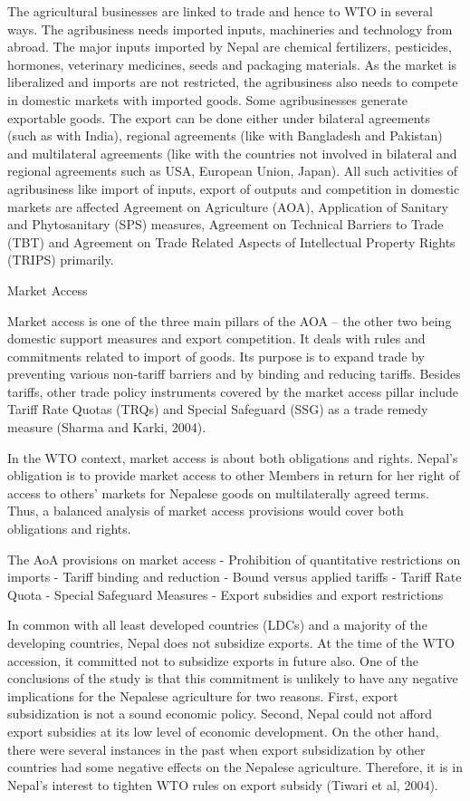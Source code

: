 \documentclass[
]{book}
\begin{document}
The agricultural businesses are linked to trade and hence to WTO in several ways. The agribusiness needs imported inputs, machineries and technology from abroad. The major inputs imported by Nepal are chemical fertilizers, pesticides, hormones, veterinary medicines, seeds and packaging materials. As the market is liberalized and imports are not restricted, the agribusiness also needs to compete in domestic markets with imported goods. Some agribusinesses generate exportable goods. The export can be done either under bilateral agreements (such as with India), regional agreements (like with Bangladesh and Pakistan) and multilateral agreements (like with the countries not involved in bilateral and regional agreements such as USA, European Union, Japan). All such activities of agribusiness like import of inputs, export of outputs and competition in domestic markets are affected Agreement on Agriculture (AOA), Application of Sanitary and Phytosanitary (SPS) measures, Agreement on Technical Barriers to Trade (TBT) and Agreement on Trade Related Aspects of Intellectual Property Rights (TRIPS) primarily.

Market Access

Market access is one of the three main pillars of the AOA -- the other two being domestic support measures and export competition. It deals with rules and commitments related to import of goods. Its purpose is to expand trade by preventing various non-tariff barriers and by binding and reducing tariffs. Besides tariffs, other trade policy instruments covered by the market access pillar include Tariff Rate Quotas (TRQs) and Special Safeguard (SSG) as a trade remedy measure (Sharma and Karki, 2004).

In the WTO context, market access is about both obligations and rights. Nepal's obligation is to provide market access to other Members in return for her right of access to others' markets for Nepalese goods on multilaterally agreed terms. Thus, a balanced analysis of market access provisions would cover both obligations and rights.

The AoA provisions on market access
- Prohibition of quantitative restrictions on imports
- Tariff binding and reduction
- Bound versus applied tariffs
- Tariff Rate Quota
- Special Safeguard Measures
- Export subsidies and export restrictions

In common with all least developed countries (LDCs) and a majority of the developing countries, Nepal does not subsidize exports. At the time of the WTO accession, it committed not to subsidize exports in future also. One of the conclusions of the study is that this commitment is unlikely to have any negative implications for the Nepalese agriculture for two reasons. First, export subsidization is not a sound economic policy. Second, Nepal could not afford export subsidies at its low level of economic development. On the other hand, there were several instances in the past when export subsidization by other countries had some negative effects on the Nepalese agriculture. Therefore, it is in Nepal's interest to tighten WTO rules on export subsidy (Tiwari et al, 2004).
\end{document}
